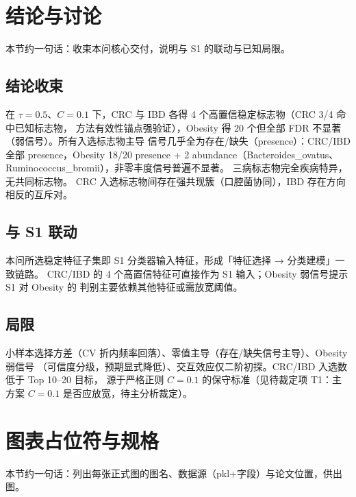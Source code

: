 \documentclass{internal-report}
\begin{document}
\section{结论与讨论}
本节约一句话：收束本问核心交付，说明与 S1 的联动与已知局限。

\subsection{结论收束}
在 $\tau=0.5$、$C=0.1$ 下，CRC 与 IBD 各得 4 个高置信稳定标志物（CRC 3/4 命中已知标志物，
方法有效性锚点强验证），Obesity 得 20 个但全部 FDR 不显著（弱信号）。所有入选标志物主导
信号几乎全为存在/缺失（presence）：CRC/IBD 全部 presence，Obesity 18/20 presence +
2 abundance（Bacteroides\_ovatus、Ruminococcus\_bromii），非零丰度信号普遍不显著。
三病标志物完全疾病特异，无共同标志物。
CRC 入选标志物间存在强共现簇（口腔菌协同），IBD 存在方向相反的互斥对。

\subsection{与 S1 联动}
本问所选稳定特征子集即 S1 分类器输入特征，形成「特征选择 → 分类建模」一致链路。
CRC/IBD 的 4 个高置信特征可直接作为 S1 输入；Obesity 弱信号提示 S1 对 Obesity 的
判别主要依赖其他特征或需放宽阈值。

\subsection{局限}
小样本选择方差（CV 折内频率回落）、零值主导（存在/缺失信号主导）、Obesity 弱信号
（可信度分级，预期显式降低）、交互效应仅二阶初探。CRC/IBD 入选数低于 Top 10--20 目标，
源于严格正则 $C=0.1$ 的保守标准（见待裁定项 T1：主方案 $C=0.1$ 是否应放宽，待主分析裁定）。

\section{图表占位符与规格}
本节约一句话：列出每张正式图的图名、数据源（pkl+字段）与论文位置，供出图。

\end{document}
